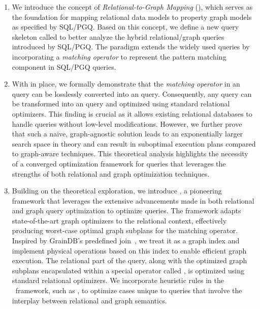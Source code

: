 \begin{enumerate}
\item We introduce the concept of \emph{Relational-to-Graph Mapping} (\rgmapping), which serves as the foundation for mapping relational data models to property graph models as specified by SQL/PGQ. Based on this concept, we define a new query skeleton called \spjm to better analyze the hybrid relational/graph queries introduced by SQL/PGQ. The \spjm paradigm extends the widely used \spj queries by incorporating a \emph{matching operator} to represent the pattern matching component in SQL/PGQ queries.

\item With \rgmapping in place, we formally demonstrate that the \emph{matching operator} in an \spjm query can be losslessly converted into an \spj query. Consequently, any \spjm query can be transformed into an \spj query and optimized using standard relational optimizers. This finding is crucial as it allows existing relational databases to handle \spjm queries without low-level modifications. However, we further prove that such a naive, graph-agnostic solution leads to an exponentially larger search space in theory and can result in suboptimal execution plans compared to graph-aware techniques. This theoretical analysis highlights the necessity of a converged optimization framework for \spjm queries that leverages the strengths of both relational and graph optimization techniques.

\item Building on the theoretical exploration, we introduce \name, a pioneering framework that leverages the extensive advancements made in both relational and graph query optimization to optimize \spjm queries. The framework adapts state-of-the-art graph optimizers to the relational context, effectively producing worst-case optimal graph subplans for the matching operator. Inspired by GrainDB's predefined join~\cite{graindb}, we treat it as a graph index and implement physical operations based on this index to enable efficient graph execution. The relational part of the query, along with the optimized graph subplans encapsulated within a special operator called \scangraphtable, is optimized using standard relational optimizers. We incorporate heuristic rules in the \name~framework, such as \filterrule, to optimize cases unique to \spjm queries that involve the interplay between relational and graph semantics.


\end{enumerate}
